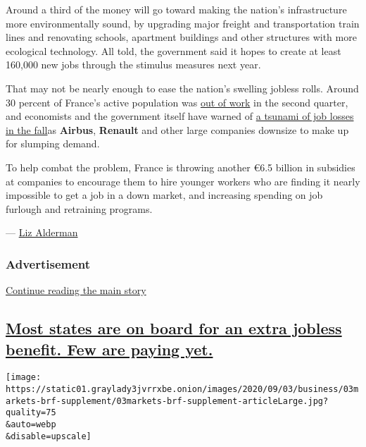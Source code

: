 Around a third of the money will go toward making the nation's
infrastructure more environmentally sound, by upgrading major freight
and transportation train lines and renovating schools, apartment
buildings and other structures with more ecological technology. All
told, the government said it hopes to create at least 160,000 new jobs
through the stimulus measures next year.

That may not be nearly enough to ease the nation's swelling jobless
rolls. Around 30 percent of France's active population was
\href{https://think.ing.com/articles/french-unemployment-reaches-historical-highs}{out
of work} in the second quarter, and economists and the government itself
have warned of
\href{https://www.nytimes3xbfgragh.onion/2020/08/24/business/europe-economy-layoffs.html}{a
tsunami of job losses in the fall}as \textbf{Airbus}, \textbf{Renault}
and other large companies downsize to make up for slumping demand.

To help combat the problem, France is throwing another €6.5 billion in
subsidies at companies to encourage them to hire younger workers who are
finding it nearly impossible to get a job in a down market, and
increasing spending on job furlough and retraining programs.

--- \href{https://www.nytimes3xbfgragh.onion/by/liz-alderman}{Liz
Alderman}

\hypertarget{advertisement-2}{%
\subsubsection{Advertisement}\label{advertisement-2}}

\protect\hyperlink{after-dfp-ad-mid3}{Continue reading the main story}

\hypertarget{most-states-are-on-board-for-an-extra-jobless-benefit-few-are-paying-yet}{%
\subsection{\texorpdfstring{\protect\hyperlink{most-states-are-on-board-for-an-extra-jobless-benefit-few-are-paying-yet}{Most
states are on board for an extra jobless benefit. Few are paying
yet.}}{Most states are on board for an extra jobless benefit. Few are paying yet.}}\label{most-states-are-on-board-for-an-extra-jobless-benefit-few-are-paying-yet}}

\texttt{[image: https://static01.graylady3jvrrxbe.onion/images/2020/09/03/business/03markets-brf-supplement/03markets-brf-supplement-articleLarge.jpg?quality=75\\\&auto=webp\\\&disable=upscale]}


